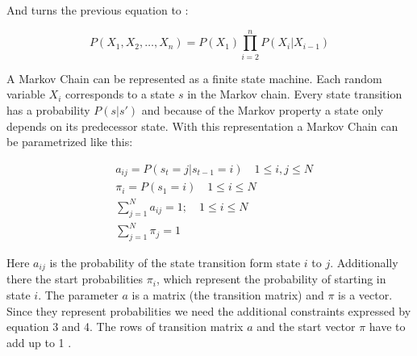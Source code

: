 And turns the previous equation to :

\begin{equation}
P\left(X_{1}, X_{2}, \ldots, X_{n}\right)=P\left(X_{1}\right) \prod_{i=2}^{n} P\left(X_{i} | X_{i-1}\right)
\end{equation}

A Markov Chain can be represented as a finite state machine. Each random variable $X_i$ corresponds to a state $s$ in the Markov chain. Every state transition has a probability $P(s | s')$ and because of the Markov property a state only depends on its predecessor state. With this representation a Markov Chain can be parametrized like this:

\begin{equation}
\begin{aligned}
&a_{i j}=P\left(s_{t}=j | s_{t-1}=i\right) \quad 1 \leq i, j \leq N \\
&\pi_{i}=P\left(s_{1}=i\right) \quad 1 \leq i \leq N \\
&\sum_{j=1}^{N} a_{i j}=1 ; \quad 1 \leq i \leq N \\
&\sum_{j=1}^{N} \pi_{j}=1
\end{aligned}
\end{equation}

Here $a_{ij}$ is the probability of the state transition form state $i$ to $j$. Additionally there the start probabilities $\pi_i$, which represent the probability of starting in state $i$. The parameter $a$ is a matrix (the transition matrix) and $\pi$ is a vector. Since they represent probabilities we need the additional constraints expressed by equation 3 and 4. The rows of transition matrix $a$ and the start vector $\pi$ have to add up to 1 \parencite{huang2001spoken}.

